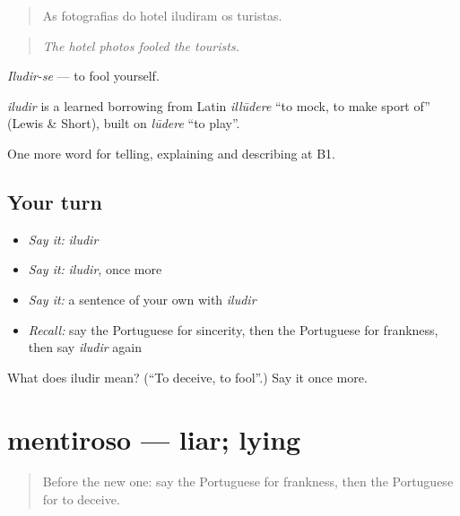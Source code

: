 \begin{quote}
As fotografias do hotel iludiram os turistas.
\end{quote}

\begin{quote}
\emph{The hotel photos fooled the tourists.}
\end{quote}

\emph{Iludir-se} — to fool yourself.

\begin{cousinweb}
\emph{iludir} is a learned borrowing from Latin \emph{illūdere} \textquotedblleft{}to mock, to make sport of\textquotedblright{} (Lewis \& Short), built on \emph{lūdere} \textquotedblleft{}to play\textquotedblright{}.
\end{cousinweb}

\begin{grammarlens}[title={What you've built}]
One more word for telling, explaining and describing at B1.
\end{grammarlens}

\subsection*{Your turn}
\begin{itemize}
\raggedright
  \item \emph{Say it:} \emph{iludir}
  \item \emph{Say it:} \emph{iludir}, once more
  \item \emph{Say it:} a sentence of your own with \emph{iludir}
  \item \emph{Recall:} say the Portuguese for sincerity, then the Portuguese for frankness, then say \emph{iludir} again
\end{itemize}

\begin{tcolorbox}[breakable,colback=teal!4,colframe=teal!35!black,title={Before you move on}]
What does iludir mean? (\textquotedblleft{}To deceive, to fool\textquotedblright{}.) Say it once more.
\end{tcolorbox}
\section[mentiroso]{mentiroso — liar; lying}

\label{lesson:PT-C471-mentiroso}



\begin{quote}
Before the new one: say the Portuguese for frankness, then the Portuguese for to deceive.
\end{quote}

